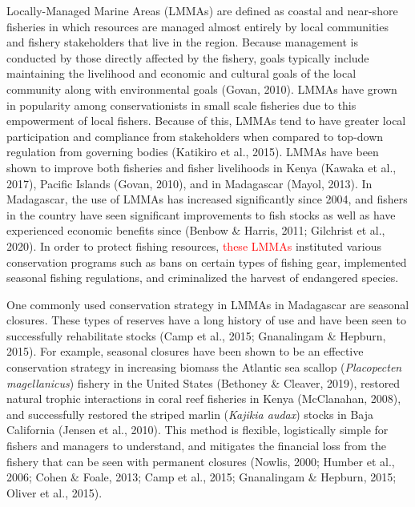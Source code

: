 \documentclass[
]{article}
\begin{document}
Locally-Managed Marine Areas (LMMAs) are defined as coastal and near-shore fisheries in which resources are managed almost entirely by local communities and fishery stakeholders that live in the region. Because management is conducted by those directly affected by the fishery, goals typically include maintaining the livelihood and economic and cultural goals of the local community along with environmental goals (Govan, 2010). LMMAs have grown in popularity among conservationists in small scale fisheries due to this empowerment of local fishers. Because of this, LMMAs tend to have greater local participation and compliance from stakeholders when compared to top-down regulation from governing bodies (Katikiro et al., 2015). LMMAs have been shown to improve both fisheries and fisher livelihoods in Kenya (Kawaka et al., 2017), Pacific Islands (Govan, 2010), and in Madagascar (Mayol, 2013). In Madagascar, the use of LMMAs has increased significantly since 2004, and fishers in the country have seen significant improvements to fish stocks as well as have experienced economic benefits since (Benbow \& Harris, 2011; Gilchrist et al., 2020). In order to protect fishing resources, \textcolor{red}{these LMMAs} instituted various conservation programs such as bans on certain types of fishing gear, implemented seasonal fishing regulations, and criminalized the harvest of endangered species.

One commonly used conservation strategy in LMMAs in Madagascar are seasonal closures. These types of reserves have a long history of use and have been seen to successfully rehabilitate stocks (Camp et al., 2015; Gnanalingam \& Hepburn, 2015). For example, seasonal closures have been shown to be an effective conservation strategy in increasing biomass the Atlantic sea scallop (\emph{Placopecten magellanicus}) fishery in the United States (Bethoney \& Cleaver, 2019), restored natural trophic interactions in coral reef fisheries in Kenya (McClanahan, 2008), and successfully restored the striped marlin (\emph{Kajikia audax}) stocks in Baja California (Jensen et al., 2010). This method is flexible, logistically simple for fishers and managers to understand, and mitigates the financial loss from the fishery that can be seen with permanent closures (Nowlis, 2000; Humber et al., 2006; Cohen \& Foale, 2013; Camp et al., 2015; Gnanalingam \& Hepburn, 2015; Oliver et al., 2015).
\end{document}
